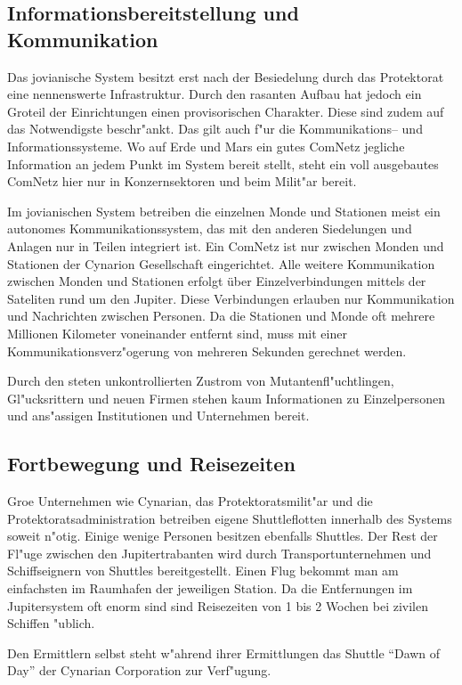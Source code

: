 \subsection{Informationsbereitstellung und Kommunikation}

Das jovianische System besitzt erst nach der Besiedelung durch das Protektorat eine nennenswerte Infrastruktur. Durch den rasanten Aufbau hat jedoch ein Gro\3teil der Einrichtungen einen provisorischen Charakter. Diese sind zudem auf das Notwendigste beschr"ankt. Das gilt auch f"ur die Kommunikations-- und Informationssysteme. Wo auf Erde und Mars ein gutes ComNetz jegliche Information an jedem Punkt im System bereit stellt, steht ein voll ausgebautes ComNetz hier nur in Konzernsektoren und beim Milit"ar bereit.

Im jovianischen System  betreiben die einzelnen Monde und Stationen meist ein autonomes Kommunikationssystem, das mit den anderen Siedelungen und Anlagen nur in Teilen integriert ist. Ein ComNetz ist nur zwischen Monden und Stationen der Cynarion Gesellschaft eingerichtet. Alle weitere Kommunikation zwischen Monden und Stationen erfolgt über Einzelverbindungen mittels der Sateliten rund um den Jupiter. Diese Verbindungen erlauben nur Kommunikation und Nachrichten zwischen Personen. Da die Stationen und Monde oft mehrere Millionen Kilometer voneinander entfernt sind, muss mit einer Kommunikationsverz"ogerung von mehreren Sekunden gerechnet werden.

Durch den steten unkontrollierten Zustrom von Mutantenfl"uchtlingen, Gl"ucksrittern und neuen Firmen stehen kaum Informationen zu Einzelpersonen und ans"assigen Institutionen und Unternehmen bereit.

\subsection{Fortbewegung und Reisezeiten}

Gro\3e Unternehmen wie Cynarian, das Protektoratsmilit"ar und die Protektoratsadministration betreiben eigene Shuttleflotten innerhalb des Systems soweit n"otig. Einige wenige Personen besitzen ebenfalls Shuttles. Der Rest der Fl"uge zwischen den Jupitertrabanten wird durch Transportunternehmen und Schiffseignern von Shuttles bereitgestellt. Einen Flug bekommt man am einfachsten im Raumhafen der jeweiligen Station. Da die Entfernungen im Jupitersystem oft enorm sind sind Reisezeiten von 1 bis 2 Wochen bei zivilen Schiffen "ublich.

Den Ermittlern selbst steht w"ahrend ihrer Ermittlungen das Shuttle "`Dawn of Day"' der Cynarian Corporation zur Verf"ugung.


